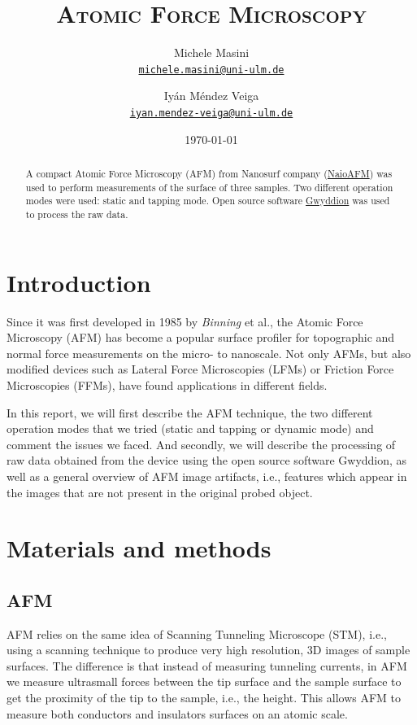 \documentclass[11pt,a4paper]{article}
\title{\bfseries\textsc{Atomic Force Microscopy}}
\author{
Michele Masini\\ \small\texttt{\href{mailto:michele.masini@uni-ulm.de}{michele.masini@uni-ulm.de}}\and
Iyán Méndez Veiga\\ \small\texttt{\href{mailto:iyan.mendez-veiga@uni-ulm.de}{iyan.mendez-veiga@uni-ulm.de}}
}
\date{\today}
\begin{document}
\maketitle

\begin{abstract}
A compact Atomic Force Microscopy (AFM) from Nanosurf company (\href{https://www.nanosurf.com/en/products/naioafm-the-leading-compact-afm}{NaioAFM}) was used to perform measurements of the surface of three samples. Two different operation modes were used: static and tapping mode. Open source software \href{http://gwyddion.net/}{Gwyddion} was used to process the raw data.
\end{abstract}

\vspace{1.5cm}

\section{Introduction}

Since it was first developed in 1985 by \emph{Binning} et al., the Atomic Force Microscopy (AFM) \cite{Bhushan} has become a popular surface profiler for topographic and normal force measurements on the micro- to nanoscale. Not only AFMs, but also modified devices such as Lateral Force Microscopies (LFMs) or Friction Force Microscopies (FFMs), have found applications in different fields.

In this report, we will first describe the AFM technique, the two different operation modes that we tried (static and tapping or dynamic mode) and comment the issues we faced. And secondly, we will describe the processing of raw data obtained from the device using the open source software Gwyddion, as well as a general overview of AFM image artifacts, i.e., features which appear in the images that are not present in the original probed object.

\section{Materials and methods}

\subsection{AFM}

AFM relies on the same idea of Scanning Tunneling Microscope (STM), i.e., using a scanning technique to produce very high resolution, 3D images of sample surfaces. The difference is that instead of measuring tunneling currents, in AFM we measure ultrasmall forces between the tip surface and the sample surface to get the proximity of the tip to the sample, i.e., the height. This allows AFM to measure both conductors and insulators surfaces on an atomic scale.
\end{document}
